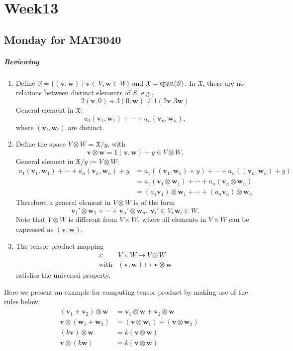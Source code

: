 \chapter{Week13}
\section{Monday for MAT3040}
\paragraph{Reviewing}


\begin{enumerate}
\item
Define $S=\{(\bm v,\bm w)\mid \bm v\in V,\bm w\in W\}$ and $\mathfrak{X}=\operatorname{span}(S)$.
In $\mathfrak{X}$, there are no relations between distinct elements of $S$, e.g.,
\[
2(\bm v,0)+3(0,\bm w)\ne1(2\bm v,3\bm w)
\]
General element in $\mathfrak{X}$:
\[
a_1(\bm v_1,\bm w_1)+\cdots+a_n(\bm v_n,\bm w_n), 
\]
where $(\bm v_i,\bm w_i)$ are distinct.
\item
Define the space $V\otimes W=\mathfrak{X}/y$, with 
\[
\bm v\otimes\bm w = 1(\bm v,\bm w)+y\in V\otimes W.
\]
General element in $\mathfrak{X}/y:=V\otimes W$:
\begin{align*}
a_1(\bm v_1,\bm w_1)+\cdots+a_n(\bm v_n,\bm w_n)+y
&=
a_1((\bm v_1,\bm w_1)+y)+\cdots+a_n((\bm v_n,\bm w_n)+y)\\
&=
a_1(\bm v_1\otimes\bm w_1)+\cdots+a_n(\bm v_n\otimes\bm w_n)\\
&=
(a_1\bm v_1)\otimes\bm w_1 + \cdots+(a_n\bm v_n)\otimes\bm w_n
\end{align*}
Therefore, a general element in $V\otimes W$ is of the form
\begin{equation}\label{Eq:13:1}
\bm v_1'\otimes\bm w_1+\cdots+\bm v_n'\otimes\bm w_n,\ 
\bm v_i'\in V, \bm w_i\in W.
\end{equation}
Note that 
$V\otimes W$ is different from $V\times W$, where all elements in $V\times W$ can be expressed as $(\bm v,\bm w)$.
\item
The tensor product mapping 
\[
\begin{array}{ll}
i:&V\times W\to V\otimes W\\
\text{with}&(\bm v,\bm w)\mapsto\bm v\otimes\bm w
\end{array}
\]
satisfies the universal property.
\end{enumerate}

Here we present an example for computing tensor product by making use of the rules below:
\begin{align*}
(\bm v_1+\bm v_2)\otimes\bm w&=\bm v_1\otimes\bm w + \bm v_2\otimes\bm w\\
\bm v\otimes(\bm w_1+\bm w_2)&=(\bm v\otimes\bm w_1)+(\bm v\otimes\bm w_2)\\
(k\bm v)\otimes\bm w&=k(\bm v\otimes\bm w)\\
\bm v\otimes(k\bm w)&=k(\bm v\otimes\bm w)
\end{align*}

